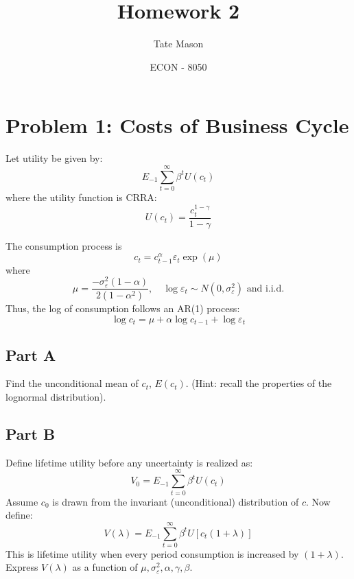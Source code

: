 \documentclass[10pt,a4paper]{article}
\title{Homework 2}
\author{Tate Mason}
\date{ECON - 8050}
\begin{document}
\maketitle

\section*{Problem 1: Costs of Business Cycle}
  Let utility be given by:
  \begin{equation*}
      E_{-1} \sum_{t=0}^{\infty} \beta^t U(c_t)
  \end{equation*}
  where the utility function is CRRA:
  \begin{equation*}
      U(c_t) = \frac{c_t^{1-\gamma}}{1- \gamma}
  \end{equation*}

  The consumption process is
  \begin{equation*}
      c_t = c_{t-1}^{\alpha} \varepsilon_t \exp(\mu)
  \end{equation*}
  where
  \begin{equation*}
      \mu = \frac{-\sigma_{\varepsilon}^2 (1-\alpha)}{2 (1-\alpha^2)}, \quad \log \varepsilon_t \sim N(0, \sigma_{\varepsilon}^2) \text{ and i.i.d.}
  \end{equation*}
  Thus, the log of consumption follows an AR(1) process:
  \begin{equation*}
      \log c_t = \mu + \alpha \log c_{t-1} + \log \varepsilon_t
  \end{equation*}

  \subsection*{Part A}
    Find the unconditional mean of $c_t$, $E(c_t)$. (Hint: recall the properties of the lognormal distribution).

  \subsection*{Part B}
    Define lifetime utility before any uncertainty is realized as:
    \begin{equation*}
        V_0 = E_{-1} \sum_{t=0}^{\infty} \beta^t U(c_t)
    \end{equation*}
    Assume $c_0$ is drawn from the invariant (unconditional) distribution of $c$.
    Now define:
    \begin{equation*}
        V(\lambda) = E_{-1} \sum_{t=0}^{\infty} \beta^t U [c_t(1 + \lambda)]
    \end{equation*}
    This is lifetime utility when every period consumption is increased by $(1+\lambda)$. Express $V(\lambda)$ as a function of $\mu, \sigma_{\varepsilon}^2, \alpha, \gamma, \beta$.
\end{document}
